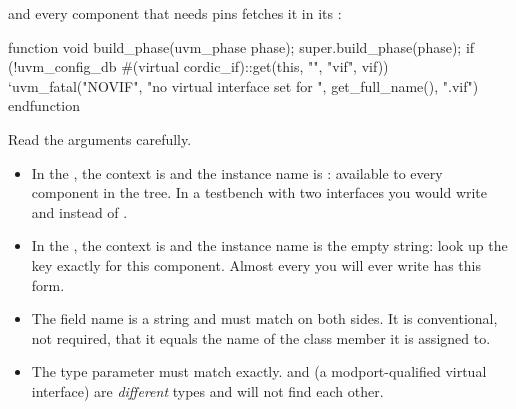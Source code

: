 and every component that needs pins fetches it in its :

\begin{uvmcode}[caption={Driver and monitor: fetch the interface handle},label={lst:uvm:vif-get}]
function void build_phase(uvm_phase phase);
  super.build_phase(phase);
  if (!uvm_config_db #(virtual cordic_if)::get(this, "", "vif", vif))
    `uvm_fatal("NOVIF",
               {"no virtual interface set for ", get_full_name(), ".vif"})
endfunction
\end{uvmcode}

Read the arguments carefully.

\begin{itemize}
  \item In the , the context is  and the instance name is
        : available to every component in the tree. In a testbench
        with two interfaces you would write  and
         instead of .
  \item In the , the context is  and the instance name is
        the empty string: look up the key exactly for this component. Almost
        every  you will ever write has this form.
  \item The field name  is a string and must match on both sides.
        It is conventional, not required, that it equals the name of the
        class member it is assigned to.
  \item The type parameter must match exactly.  and
         (a modport-qualified virtual interface)
        are \emph{different} types and will not find each other.
\end{itemize}

